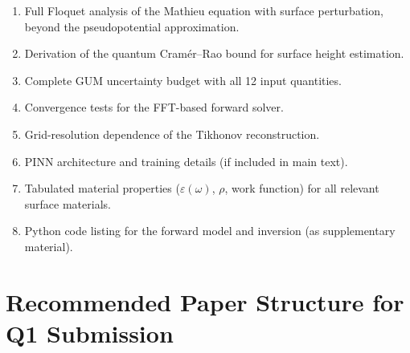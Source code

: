 \documentclass[11pt,a4paper]{article}
\begin{document}
\begin{enumerate}[label=\textbf{S\arabic*}, leftmargin=*]
    \item Full Floquet analysis of the Mathieu equation with surface perturbation, beyond the pseudopotential approximation.
    \item Derivation of the quantum Cram\'er--Rao bound for surface height estimation.
    \item Complete GUM uncertainty budget with all 12 input quantities.
    \item Convergence tests for the FFT-based forward solver.
    \item Grid-resolution dependence of the Tikhonov reconstruction.
    \item PINN architecture and training details (if included in main text).
    \item Tabulated material properties ($\varepsilon(\omega)$, $\rho$, work function) for all relevant surface materials.
    \item Python code listing for the forward model and inversion (as supplementary material).
\end{enumerate}

\section{Recommended Paper Structure for Q1 Submission}
\end{document}

